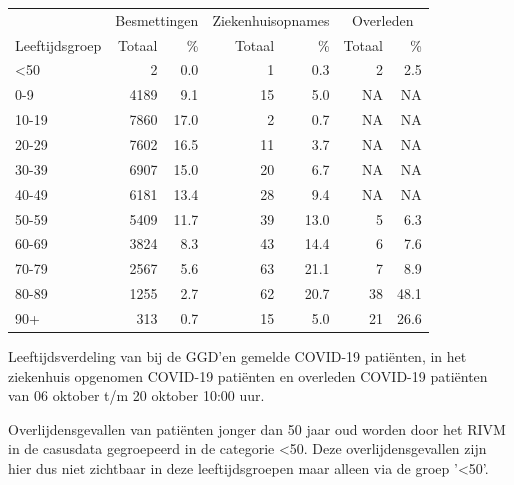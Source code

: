 \documentclass[
  english,
  man,floatsintext]{apa6}
\begin{document}
\begin{table}
\centering\begingroup\fontsize{11}{13}\selectfont

\begin{threeparttable}
\begin{tabular}{lrrrrrr}
\toprule
\multicolumn{1}{c}{ } & \multicolumn{2}{c}{Besmettingen} & \multicolumn{2}{c}{Ziekenhuisopnames} & \multicolumn{2}{c}{Overleden} \\
\cmidrule(l{3pt}r{3pt}){2-3} \cmidrule(l{3pt}r{3pt}){4-5} \cmidrule(l{3pt}r{3pt}){6-7}
Leeftijdsgroep & Totaal & \% & Totaal & \% & Totaal & \%\\
\midrule
<50 & 2 & 0.0 & 1 & 0.3 & 2 & 2.5\\
0-9 & 4189 & 9.1 & 15 & 5.0 & NA & NA\\
10-19 & 7860 & 17.0 & 2 & 0.7 & NA & NA\\
20-29 & 7602 & 16.5 & 11 & 3.7 & NA & NA\\
30-39 & 6907 & 15.0 & 20 & 6.7 & NA & NA\\
40-49 & 6181 & 13.4 & 28 & 9.4 & NA & NA\\
50-59 & 5409 & 11.7 & 39 & 13.0 & 5 & 6.3\\
60-69 & 3824 & 8.3 & 43 & 14.4 & 6 & 7.6\\
70-79 & 2567 & 5.6 & 63 & 21.1 & 7 & 8.9\\
80-89 & 1255 & 2.7 & 62 & 20.7 & 38 & 48.1\\
90+ & 313 & 0.7 & 15 & 5.0 & 21 & 26.6\\
\bottomrule
\end{tabular}
\begin{tablenotes}
\item[1] Leeftijdsverdeling van bij de GGD’en gemelde COVID-19 patiënten, in het ziekenhuis opgenomen COVID-19 patiënten en overleden COVID-19 patiënten van 06 oktober t/m 20 oktober 10:00 uur.
\item[2] Overlijdensgevallen van patiënten jonger dan 50 jaar oud worden door het RIVM in de casusdata gegroepeerd in de categorie <50. Deze overlijdensgevallen zijn hier dus niet zichtbaar in deze leeftijdsgroepen maar alleen via de groep '<50'.
\end{tablenotes}
\end{threeparttable}
\endgroup{}
\end{table}

\newpage
\end{document}
